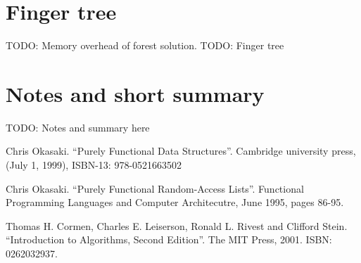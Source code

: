 \documentclass{article}
\begin{document}
\section{Finger tree}
TODO: Memory overhead of forest solution.
TODO: Finger tree


\section{Notes and short summary}

TODO: Notes and summary here


\begin{thebibliography}{99}

Chris Okasaki. ``Purely Functional Data Structures''. Cambridge university press, (July 1, 1999), ISBN-13: 978-0521663502

Chris Okasaki. ``Purely Functional Random-Access Lists''. Functional Programming Languages and Computer Architecutre, June 1995, pages 86-95.

Thomas H. Cormen, Charles E. Leiserson, Ronald L. Rivest and Clifford Stein. ``Introduction to Algorithms, Second Edition''. The MIT Press, 2001. ISBN: 0262032937.

\end{thebibliography}

\ifx\wholebook\relax \else
\end{document}
